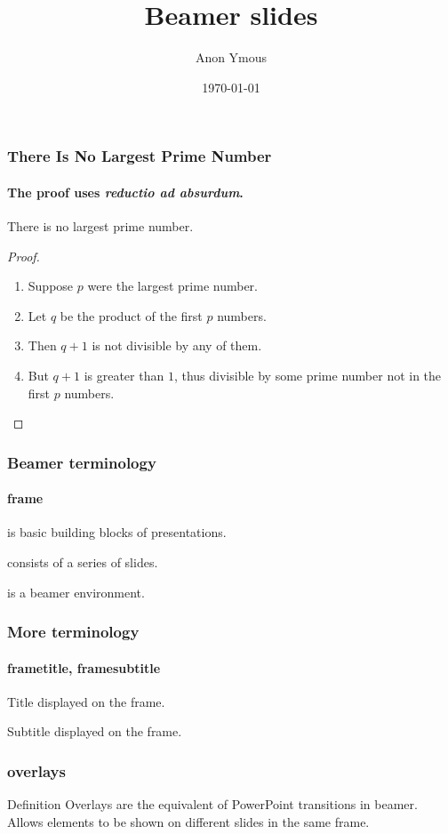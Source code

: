 \documentclass[handout]{beamer}
\author{Anon Ymous}
\date{\today}
\title{Beamer slides}
\begin{document}
\begin{frame}
    \frametitle{There Is No Largest Prime Number}
    \framesubtitle{The proof uses \textit{reductio ad absurdum}.}
    \begin{theorem}
        There is no largest prime number.
    \end{theorem}
    \begin{proof}
        \begin{enumerate}
            \item<1-| alert@1> Suppose $p$ were the largest prime number.
            \item<2-> Let $q$ be the product of the first $p$ numbers.
            \item<3-> Then $q+1$ is not divisible by any of them.
            \item<1-> But $q + 1$ is greater than $1$, thus divisible by some prime
            number not in the first $p$ numbers.\qedhere
        \end{enumerate}
    \end{proof}
\end{frame}
\begin{frame}
    \frametitle{Beamer terminology}
    \framesubtitle{frame}
    \begin{description}
        \item<1-| alert@1>[frame] is basic building blocks of presentations.
        \item<2-| alert@2>[frame] consists of a series of slides.
        \item<3-| alert@3>[frame] is a beamer environment.
    \end{description}
\end{frame}
\begin{frame}
    \frametitle{More terminology}
    \framesubtitle{frametitle, framesubtitle}
    \begin{description}
        \item<1-| alert@1>[frametitle] Title displayed on the frame.
        \item<2-| alert@2>[framesubtitle] Subtitle displayed on the frame.
    \end{description}
\end{frame}
\begin{frame}
    \frametitle{overlays}
    \begin{block}{Definition}
        \alert{Overlays} are the equivalent of PowerPoint transitions in beamer.
        Allows elements to be shown on different slides in the same frame.
    \end{block}
\end{frame}
\end{document}

